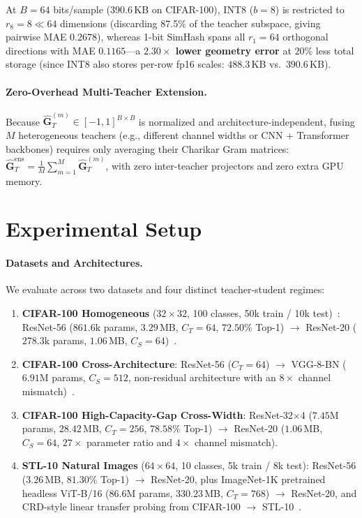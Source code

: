 \documentclass{article}
\begin{document}
At $B = 64$ bits/sample ($390.6$\,KB on CIFAR-100), INT8 ($b=8$) is restricted to $r_8 = 8 \ll 64$ dimensions (discarding 87.5\% of the teacher subspace, giving pairwise MAE $0.2678$), whereas 1-bit SimHash spans all $r_1 = 64$ orthogonal directions with MAE $0.1165$---a \textbf{$2.30\times$ lower geometry error} at $20\%$ less total storage (since INT8 also stores per-row fp16 scales: $488.3$\,KB vs.\ $390.6$\,KB).

\paragraph{Zero-Overhead Multi-Teacher Extension.}
Because $\hat{\mathbf{G}}_T^{(m)} \in [-1,1]^{B\times B}$ is normalized and architecture-independent, fusing $M$ heterogeneous teachers (e.g., different channel widths or CNN + Transformer backbones) requires only averaging their Charikar Gram matrices: $\hat{\mathbf{G}}_T^{\text{ens}} = \frac{1}{M}\sum_{m=1}^M \hat{\mathbf{G}}_T^{(m)}$, with zero inter-teacher projectors and zero extra GPU memory.

\section{Experimental Setup}
\label{sec:setup}

\paragraph{Datasets and Architectures.}
We evaluate across two datasets and four distinct teacher-student regimes:
\begin{enumerate}
    \item \textbf{CIFAR-100 Homogeneous} ($32\times32$, 100 classes, 50k train / 10k test)~\citep{krizhevsky2009learning}: ResNet-56 ($861.6\text{k}$ params, $3.29$\,MB, $C_T=64$, $72.50\%$ Top-1) $\to$ ResNet-20 ($278.3\text{k}$ params, $1.06$\,MB, $C_S=64$)~\citep{he2016deep}.
    \item \textbf{CIFAR-100 Cross-Architecture}: ResNet-56 ($C_T=64$) $\to$ VGG-8-BN ($6.91\text{M}$ params, $C_S=512$, non-residual architecture with an $8\times$ channel mismatch)~\citep{simonyan2015vgg}.
    \item \textbf{CIFAR-100 High-Capacity-Gap Cross-Width}: ResNet-32$\times$4 ($7.45\text{M}$ params, $28.42$\,MB, $C_T=256$, $78.58\%$ Top-1) $\to$ ResNet-20 ($1.06$\,MB, $C_S=64$, $27\times$ parameter ratio and $4\times$ channel mismatch).
    \item \textbf{STL-10 Natural Images} ($64\times64$, 10 classes, 5k train / 8k test): ResNet-56 ($3.26$\,MB, $81.30\%$ Top-1) $\to$ ResNet-20, plus ImageNet-1K pretrained headless ViT-B/16 ($86.6\text{M}$ params, $330.23$\,MB, $C_T=768$) $\to$ ResNet-20, and CRD-style linear transfer probing from CIFAR-100 $\to$ STL-10~\citep{tian2020crd}.
\end{enumerate}
\end{document}
